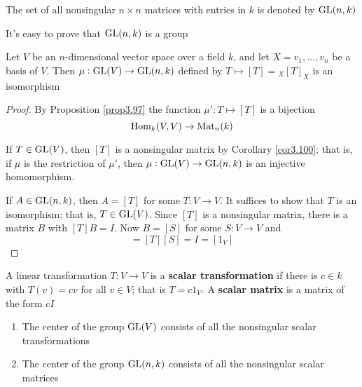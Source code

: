 \documentclass[11pt]{article}
\begin{document}
\begin{definition}[]
The set of all nonsingular \(n\times n\) matrices with entries in \(k\) is
denoted by \(\text{GL}(n,k)\)
\end{definition}

It's easy to prove that \(\text{GL}(n,k)\) is a group

\begin{proposition}[]
Let \(V\) be an \(n\)-dimensional vector space over a field \(k\), and let
\(X=v_1,\dots,v_n\) be a basis of \(V\). Then \(\mu:\text{GL}(V)\to\text{GL}(n,k)\) defined
by \(T\mapsto[T]={}_X[T]_X\) is an isomorphism
\end{proposition}

\begin{proof}
By Proposition \ref{prop3.97} the function \(\mu':T\mapsto[T]\) is a bijection
\begin{equation*}
\operatorname{Hom}_k(V,V)\to\operatorname{Mat}_n(k)
\end{equation*}

If \(T\in\text{GL}(V)\), then \([T]\) is a nonsingular matrix by Corollary
\ref{cor3.100}; that is, if \(\mu\) is the restriction of \(\mu'\), then 
\(\mu:\text{GL}(V)\to\text{GL}(n,k)\) is an injective homomorphism.

If \(A\in\text{GL}(n,k)\), then \(A=[T]\) for some \(T:V\to V\). It suffices to
show that \(T\) is an isomorphism; that is, \(T\in\text{GL}(V)\). Since \([T]\) is
a nonsingular matrix, there is a matrix \(B\) with \([T]B=I\). Now \(B=[S]\)
for some \(S:V\to V\) and 
\begin{equation*}
[TS]=[T][S]=I=[1_V]
\end{equation*}
\end{proof}

\begin{definition}[]
A linear transformation \(T:V\to V\) is a \textbf{scalar transformation} if there is 
\(c\in k\) with \(T(v)=cv\) for all \(v\in V\); that is \(T=c1_V\). A
\textbf{scalar matrix} is a matrix of the form \(cI\)
\end{definition}

\begin{corollary}[]
\begin{enumerate}
\item The center of the group \(\text{GL}(V)\) consists of all the nonsingular scalar
transformations
\item The center of the group \(\text{GL}(n,k)\) consists of all the nonsingular
scalar matrices
\end{enumerate}
\end{corollary}
\end{document}

